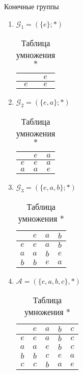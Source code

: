 \documentclass[../main/document.tex]{subfiles}
\begin{document}
\begin{exm}
Конечные группы
\begin{enumerate}
\item $\mathcal{G}_1=(\{e\};*)$
\begin{table}[h]
\centering
\caption*{Таблица умножения $*$}
\renewcommand*{\arraystretch}{1.4}
\begin{tabular}{c|c}
  & $e$  \\ \hline
$e$ & $e$ \\

\end{tabular}
\end{table}
\item $\mathcal{G}_2=(\{e,a\};*)$
\begin{table}[H]
\centering
\caption*{Таблица умножения $*$}
\renewcommand*{\arraystretch}{1.4}
\begin{tabular}{c|c|c}
  & $e$ & $a$   \\ \hline
$e$ & $e$ & $a$  \\ \hline
$a$ & $a$ & $e$ \\
\end{tabular}
\end{table}
\item $\mathcal{G}_3=(\{e,a,b\};*)$
\begin{table}[H]
\centering
\caption*{Таблица умножения $*$}
\renewcommand*{\arraystretch}{1.4}
\begin{tabular}{c|c|c|c}
  & $e$ & $a$  &$b$  \\ \hline
$e$ & $e$ & $a$ &$b$ \\ \hline
$a$ & $a$ & $b$ &$e$ \\ \hline
$b$ & $b$ & $e$ & $a$\\
\end{tabular}
\end{table}
\item $\mathcal{A}=(\{e,a,b,c\},*)$
\begin{table}[h]
\centering
\caption*{Таблица умножения $*$}
\renewcommand*{\arraystretch}{1.4}
\begin{tabular}{c|c|c|c|c}
  & $e$ & $a$ & $b$ & $c$ \\ \hline
$e$ & $e$ & $a$ & $b$ & $c$ \\ \hline
$a$ & $a$ & $e$ & $b$ & $c$ \\ \hline
$b$ & $b$ & $c$ & $e$ & $a$ \\ \hline
$c$ & $c$ & $b$& $a$ & $e$ \\ 
\end{tabular}
\end{table}
\end{enumerate}
\end{exm}
\end{document}
